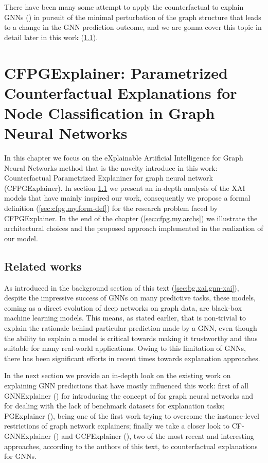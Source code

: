 \documentclass[binding=0.6cm]{sapthesis}
\newcommand{\mycite}[1]{(\cite{#1})}
\begin{document}
There have been many some attempt to apply the counterfactual to explain GNNs \mycite{lucic2022-cfgnnexplainer,bajaj2022-robustCF,huang2023-globalCF} in pursuit of the minimal perturbation of the graph structure that leads to a change in the GNN prediction outcome, and we are gonna cover this topic in detail later in this work (\cref{sec:cfpg.bg}).



\chapter[CFPGExplainer]{CFPGExplainer: Parametrized Counterfactual Explanations for Node Classification in Graph Neural Networks}
\label{chap:3-CFPG}
In this chapter we focus on the eXplainable Artificial Intelligence for Graph Neural Networks method that is the novelty introduce in this work: Counterfactual Parametrized Explaniner for graph neural network (CFPGExplainer). In section \ref{sec:cfpg.bg} we present an in-depth analysis of the XAI models that have mainly inspired our work, consequently we propose a formal definition (\cref{sec:cfpg.my.form-def}) for the research problem faced by CFPGExplainer. In the end of the chapter (\cref{sec:cfpg.my.archs}) we illustrate the architectural choices and the proposed approach implemented in the realization of our model.

\section{Related works}
\label{sec:cfpg.bg}
As introduced in the background section of this text (\cref{sec:bg.xai.gnn-xai}), despite the impressive success of GNNs on many predictive tasks, these models, coming as a direct evolution of deep networks on graph data, are black-box machine learning models. This means, as stated earlier, that is non-trivial to explain the rationale behind particular prediction made by a GNN, even though the ability to explain a model is critical towards making it trustworthy and thus suitable for many real-world applications. Owing to this limitation of GNNs, there has been significant efforts in recent times towards explanation approaches. 

In the next section we provide an in-depth look on the existing work on explaining GNN predictions that have mostly influenced this work: first of all GNNExplainer \mycite{ying2019-gnnexplainer} for introducing the concept of  for graph neural networks and for dealing with the lack of benchmark datasets for explanation tasks; PGExplainer \mycite{luo2020-pgexplainer}, being one of the first work trying to overcome the instance-level restrictions of graph network explainers; finally we take a closer look to CF-GNNExplainer \mycite{lucic2022-cfgnnexplainer} and GCFExplainer \mycite{huang2023-globalCF}, two of the most recent and interesting approaches, according to the authors of this text, to counterfactual explanations for GNNs. 
\end{document}
